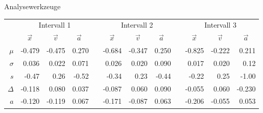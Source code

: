 \documentclass{alex_gp}
\begin{document}
\begin{mybox}{Analysewerkzeuge}
	\begin{tabular}{@{}r rrr c rrr c rrr@{}}\toprule
		& \multicolumn{3}{c}{Intervall 1} & \phantom{ac}& \multicolumn{3}{c}{Intervall 2} &	\phantom{ac} & \multicolumn{3}{c}{Intervall 3}\\
		\cmidrule{2-4} \cmidrule{6-8} \cmidrule{10-12}
		& $\vec{x}\quad$ & $\vec{v}\quad$ & $\vec{a}\quad$ && $\vec{x}\quad$ & $\vec{v}\quad$ & $\vec{a}\quad$ && $\vec{x}\quad$ & $\vec{v}\quad$ & $\vec{a}\quad$\\ \midrule
		$\mu$ & -0.479 & -0.475 & 0.270 && -0.684 & -0.347 & 0.250 && -0.825 & -0.222 & 0.211\\
		$\sigma$ & 0.036 & 0.022 & 0.071&& 0.026 & 0.020 & 0.090 && 0.017 & 0.020 & 0.12\\
		$s$ & -0.47 & 0.26& -0.52&& -0.34& 0.23& -0.44&& -0.22& 0.25& -1.00\\
		$\Delta$ & -0.118 & 0.080& 0.037&& -0.087& 0.060& 0.090&& -0.055& 0.060& -0.230\\
		$a$ & -0.120 & -0.119& 0.067&& -0.171& -0.087& 0.063&& -0.206& -0.055& 0.053\\
		\bottomrule
	\end{tabular}
	\label{table:1}
	\tcbbreak

\end{mybox}
\end{document}
